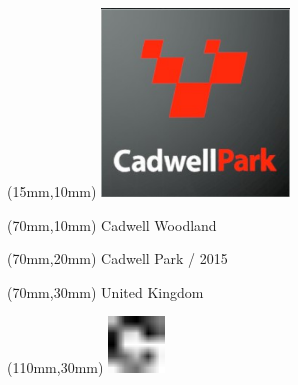 \null\newpage
\begin{textblock*}{50mm}(15mm,10mm)%
\includegraphics[width=50mm]{LG/2015-05-20_00076.png}
\end{textblock*}
\begin{textblock*}{130mm}(70mm,10mm)%
{\fontsize{20}{20}\selectfont Cadwell Woodland}\\
\end{textblock*}
\begin{textblock*}{120mm}(70mm,20mm)%
{\fontsize{16}{16}\selectfont Cadwell Park / 2015}\\
\end{textblock*}
\begin{textblock*}{120mm}(70mm,30mm)%
{\fontsize{12}{12}\selectfont United Kingdom}
\end{textblock*}
\begin{textblock*}{30mm}(110mm,30mm)%
\centering
\includegraphics[height=15mm]{icons/fa-rotate-right.pdf}
\end{textblock*}

